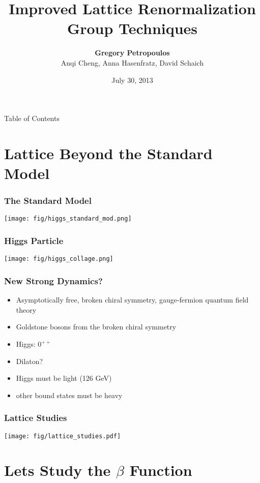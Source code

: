 \documentclass{beamer}
\title{\huge{Improved Lattice Renormalization Group Techniques}}
\author{\textbf{Gregory Petropoulos}\\ Anqi Cheng, Anna Hasenfratz, David Schaich}
\institute{University of Colorado Boulder}
\date{July 30, 2013}
\begin{document}
  {
    \begin{frame}
      \titlepage
    \end{frame}
  }
  \addtocounter{framenumber}{-1}

  \begin{frame}{Table of Contents}
    \tableofcontents
  \end{frame}
  \addtocounter{framenumber}{-1}

  \section{Lattice Beyond the Standard Model}
  \addtocounter{framenumber}{-1}

  \begin{frame}
    \frametitle{The Standard Model}
    \centering
    \texttt{[image: fig/higgs\_standard\_mod.png]}
  \end{frame}

  \begin{frame}
    \frametitle{Higgs Particle}
    \centering
    \texttt{[image: fig/higgs\_collage.png]}
  \end{frame}

  \begin{frame}
    \frametitle{New Strong Dynamics?}
    \begin{itemize}
      \item Asymptotically free, broken chiral symmetry, gauge-fermion quantum field theory
      \item Goldstone bosons from the broken chiral symmetry
      \item Higgs:  $0^{++}$
      \item Dilaton?
      \item Higgs must be light (126 GeV)
      \item other bound states must be heavy
    \end{itemize}
  \end{frame}

  \begin{frame}
    \frametitle{Lattice Studies}
    \centering
    \texttt{[image: fig/lattice\_studies.pdf]}
  \end{frame}

  \section{Lets Study the $\beta$ Function}
  \addtocounter{framenumber}{-1}
\end{document}
